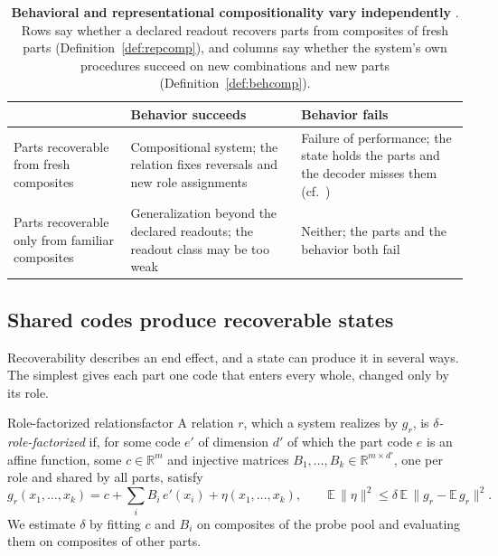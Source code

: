 \documentclass[10pt]{article}
\theoremstyle{plain}
\theoremstyle{remark}
\newcommand{\R}{\mathbb{R}}
\begin{document}
\begin{table}[tbp]
  \caption{\textbf{Behavioral and representational compositionality vary independently} \citep[cf.][]{vegner2025}. Rows say whether a declared readout recovers parts from composites of fresh parts (Definition~\ref{def:repcomp}), and columns say whether the system's own procedures succeed on new combinations and new parts (Definition~\ref{def:behcomp}).}
  \label{tab:twobytwo}
  \centering\small
  \begin{tabularx}{\linewidth}{@{}P{3.2cm}YY@{}}
    \toprule
    & Behavior succeeds & Behavior fails \\
    \midrule
    Parts recoverable from fresh composites & Compositional system; the relation fixes reversals and new role assignments & Failure of performance; the state holds the parts and the decoder misses them (cf.\ \citealt{montero2021,park2024hidden}) \\
    Parts recoverable only from familiar composites & Generalization beyond the declared readouts; the readout class may be too weak & Neither; the parts and the behavior both fail \\
    \bottomrule
  \end{tabularx}
\end{table}

\subsection{Shared codes produce recoverable states}
\label{sec:mechanics}

Recoverability describes an end effect, and a state can produce it in several ways. The simplest gives each part one code that enters every whole, changed only by its role.

\begin{defbox}{Role-factorized relations}{factor}
A relation $r$, which a system realizes by $g_r$, is \emph{$\delta$-role-factorized} if, for some code $e'$ of dimension $d'$ of which the part code $e$ is an affine function, some $c \in \R^m$ and injective matrices $B_1, \ldots, B_k \in \R^{m \times d'}$, one per role and shared by all parts, satisfy
\begin{equation}
  g_r(x_1, \ldots, x_k) = c + \textstyle\sum_{i} B_i\, e'(x_i) + \eta(x_1, \ldots, x_k), \qquad \mathbb{E}\,\lVert \eta \rVert^2 \le \delta\, \mathbb{E}\,\lVert g_r - \mathbb{E}\,g_r \rVert^2 .
  \label{eq:factor}
\end{equation}
We estimate $\delta$ by fitting $c$ and $B_i$ on composites of the probe pool and evaluating them on composites of other parts.
\end{defbox}
\end{document}

